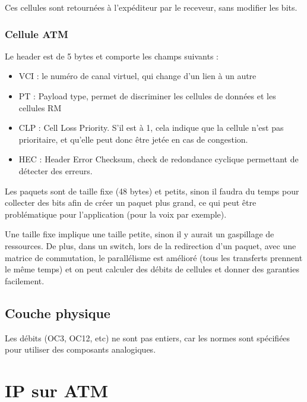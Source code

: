 	Ces cellules sont retournées à l'expéditeur par le receveur, sans modifier les bits.
	
	
		\subsubsection{Cellule ATM}
		
		
		Le header est de 5 bytes et comporte les champs suivants :
	
		\begin{itemize}
			\item VCI : le numéro de canal virtuel, qui change d'un lien à un autre 
			\item PT : Payload type, permet de discriminer les cellules de données et les cellules RM
			\item CLP : Cell Loss Priority. S'il est à 1, cela indique que la cellule n'est pas prioritaire, et qu'elle peut donc être jetée en cas de congestion.
			\item HEC : Header Error Checksum, check de redondance cyclique permettant de détecter des erreurs.
		\end{itemize}
		
						
		Les paquets sont de taille fixe (48 bytes) et petits, sinon il faudra du temps pour collecter des bits afin de créer un paquet plus grand, ce qui peut être problématique pour l'application (pour la voix par exemple). 
	
		Une taille fixe implique une taille petite, sinon il y aurait un gaspillage de ressources. De plus, dans un switch, lors de la redirection d'un paquet, avec une matrice de commutation, le parallélisme est amélioré (tous les transferts prennent le même temps) et on peut calculer des débits de cellules et donner des garanties facilement.
	
		\subsection{Couche physique}
		
		
		Les débits (OC3, OC12, etc) ne sont pas entiers, car les normes sont spécifiées pour utiliser des composants analogiques.
	
	\section{IP sur ATM}
	
